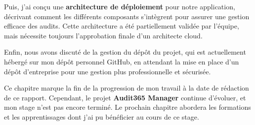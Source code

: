Puis, j'ai conçu une \textbf{architecture de déploiement} pour notre application, décrivant comment les différents composants s'intègrent pour assurer une gestion efficace des audits. Cette architecture a été partiellement validée par l'équipe, mais nécessite toujours l'approbation finale d'un architecte cloud.

Enfin, nous avons discuté de la gestion du dépôt du projet, qui est actuellement hébergé sur mon dépôt personnel GitHub, en attendant la mise en place d'un dépôt d'entreprise pour une gestion plus professionnelle et sécurisée.

Ce chapitre marque la fin de la progression de mon travail à la date de rédaction de ce rapport. Cependant, le projet \textbf{Audit365 Manager} continue d'évoluer, et mon stage n'est pas encore terminé. Le prochain chapitre abordera les formations et les apprentissages dont j'ai pu bénéficier au cours de ce stage.
